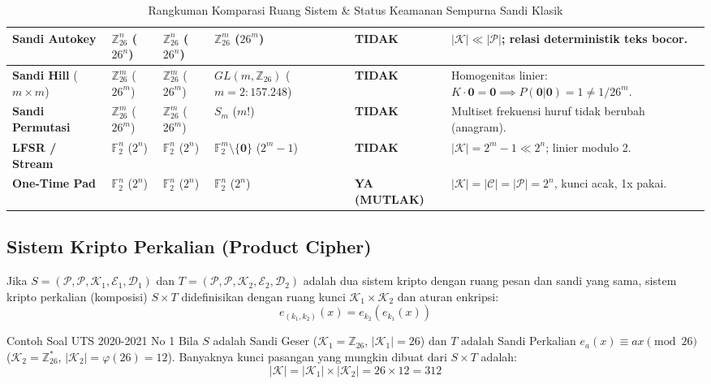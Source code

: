 \documentclass[11pt,a4paper]{article}
\begin{document}
\begin{table}[H]
\begin{tabular}{p{3.2cm} p{2.2cm} p{2.2cm} p{3.2cm} p{2.4cm} p{2.8cm}}
\midrule
\textbf{Sandi Autokey} & $\mathbb{Z}_{26}^n$ ($26^n$) & $\mathbb{Z}_{26}^n$ ($26^n$) & $\mathbb{Z}_{26}^m$ ($26^m$) & \textbf{TIDAK} & $|\mathcal{K}| \ll |\mathcal{P}|$; relasi deterministik teks bocor. \\
\midrule
\textbf{Sandi Hill} ($m \times m$) & $\mathbb{Z}_{26}^m$ ($26^m$) & $\mathbb{Z}_{26}^m$ ($26^m$) & $GL(m, \mathbb{Z}_{26})$ \newline ($m=2: 157.248$) & \textbf{TIDAK} & Homogenitas linier: $K \cdot \mathbf{0} = \mathbf{0} \implies P(\mathbf{0}|\mathbf{0})=1 \neq 1/26^m$. \\
\midrule
\textbf{Sandi Permutasi} & $\mathbb{Z}_{26}^m$ ($26^m$) & $\mathbb{Z}_{26}^m$ ($26^m$) & $S_m$ ($m!$) & \textbf{TIDAK} & Multiset frekuensi huruf tidak berubah (anagram). \\
\midrule
\textbf{LFSR / Stream} & $\mathbb{F}_2^n$ ($2^n$) & $\mathbb{F}_2^n$ ($2^n$) & $\mathbb{F}_2^m \setminus \{\mathbf{0}\}$ ($2^m - 1$) & \textbf{TIDAK} & $|\mathcal{K}| = 2^m - 1 \ll 2^n$; linier modulo 2. \\
\midrule
\textbf{One-Time Pad} & $\mathbb{F}_2^n$ ($2^n$) & $\mathbb{F}_2^n$ ($2^n$) & $\mathbb{F}_2^n$ ($2^n$) & \textbf{YA (MUTLAK)} & $|\mathcal{K}|=|\mathcal{C}|=|\mathcal{P}|=2^n$, kunci acak, 1x pakai. \\
\bottomrule
\end{tabular}
\caption{Rangkuman Komparasi Ruang Sistem \& Status Keamanan Sempurna Sandi Klasik}
\end{table}

\subsection{Sistem Kripto Perkalian (Product Cipher)}
Jika $S = (\mathcal{P}, \mathcal{P}, \mathcal{K}_1, \mathcal{E}_1, \mathcal{D}_1)$ dan $T = (\mathcal{P}, \mathcal{P}, \mathcal{K}_2, \mathcal{E}_2, \mathcal{D}_2)$ adalah dua sistem kripto dengan ruang pesan dan sandi yang sama, sistem kripto perkalian (komposisi) $S \times T$ didefinisikan dengan ruang kunci $\mathcal{K}_1 \times \mathcal{K}_2$ dan aturan enkripsi:
\[
e_{(k_1, k_2)}(x) = e_{k_2}(e_{k_1}(x))
\]
\begin{perhatianbox}{Contoh Soal UTS 2020-2021 No 1}
Bila $S$ adalah Sandi Geser ($\mathcal{K}_1 = \mathbb{Z}_{26}$, $|\mathcal{K}_1| = 26$) dan $T$ adalah Sandi Perkalian $e_a(x) \equiv ax \pmod{26}$ ($\mathcal{K}_2 = \mathbb{Z}_{26}^*$, $|\mathcal{K}_2| = \varphi(26) = 12$). Banyaknya kunci pasangan yang mungkin dibuat dari $S \times T$ adalah:
\[
|\mathcal{K}| = |\mathcal{K}_1| \times |\mathcal{K}_2| = 26 \times 12 = 312
\]
\end{perhatianbox}
\end{document}
